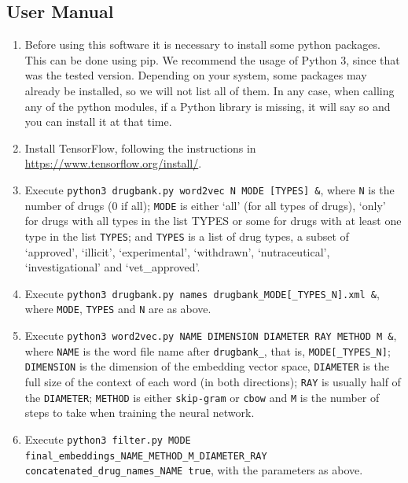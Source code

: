 \documentclass[12pt, openany]{book}
\begin{document}
\begin{appendices}
\chapter{User Manual}

\begin{enumerate}
	\item Before using this software it is necessary to install some python packages. This can be done using pip. We recommend the usage of Python 3, since that was the tested version. Depending on your system, some packages may already be installed, so we will not list all of them. In any case, when calling any of the python modules, if a Python library is missing, it will say so and you can install it at that time.

	\item Install TensorFlow, following the instructions in \url{https://www.tensorflow.org/install/}.

	\item Execute \texttt{python3 drugbank.py word2vec N MODE [TYPES] \&}, where \texttt{N} is the number of drugs (0 if all); \texttt{MODE} is either `all' (for all types of drugs), `only' for drugs with all types in the list TYPES or some for drugs with at least one type in the list \texttt{TYPES}; and \texttt{TYPES} is a list of drug types, a subset of `approved', `illicit', `experimental', `withdrawn', `nutraceutical', `investigational' and `vet\_approved'.

	\item Execute \texttt{python3 drugbank.py names drugbank\_MODE[\_TYPES\_N].xml \&}, where \texttt{MODE}, \texttt{TYPES} and \texttt{N} are as above.

	\item Execute \texttt{python3 word2vec.py NAME DIMENSION DIAMETER RAY METHOD M \&}, where \texttt{NAME} is the word file name after \texttt{drugbank\_}, that is, \texttt{MODE[\_TYPES\_N]}; \texttt{DIMENSION} is the dimension of the embedding vector space, \texttt{DIAMETER} is the full size of the context of each word (in both directions); \texttt{RAY} is usually half of the \texttt{DIAMETER}; \texttt{METHOD} is either \texttt{skip-gram} or \texttt{cbow} and \texttt{M} is the number of steps to take when training the neural network.

	\item Execute \texttt{python3 filter.py MODE final\_embeddings\_NAME\_METHOD\_M\_DIAMETER\_RAY concatenated\_drug\_names\_NAME true}, with the parameters as above.


\end{enumerate}
\end{appendices}
\end{document}
